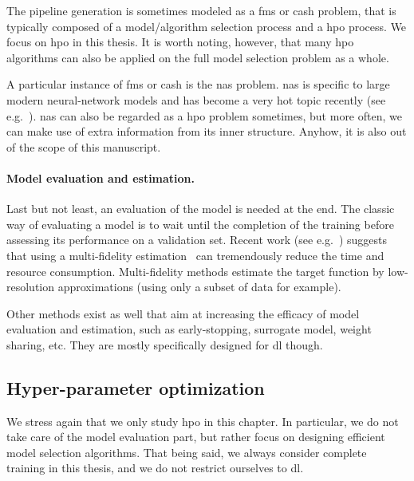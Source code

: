 The pipeline generation is sometimes modeled as a \gls{fms} or \gls{cash} problem, that is typically composed of a model/algorithm selection process and a \gls{hpo} process. We focus on \gls{hpo} in this thesis. It is worth noting, however, that many \gls{hpo} algorithms can also be applied on the full model selection problem as a whole.

A particular instance of \gls{fms} or \gls{cash} is the \gls{nas} problem. \gls{nas} is specific to large modern neural-network models and has become a very hot topic recently (see e.g.~\citealt{elsken2018nas,zoph2018nas,kandasamy2018nas,liu2019darts}). \gls{nas} can also be regarded as a \gls{hpo} problem sometimes, but more often, we can make use of extra information from its inner structure. Anyhow, it is also out of the scope of this manuscript.

\paragraph{Model evaluation and estimation.}
Last but not least, an evaluation of the model is needed at the end. The classic way of evaluating a model is to wait until the completion of the training before assessing its performance on a validation set. Recent work (see e.g.~\citealt{li2017hyperband}) suggests that using a multi-fidelity estimation~\citep{huang2006multifidelity,wu2019multi-fidelity,peherstorfer2018multifidelity} can tremendously reduce the time and resource consumption. Multi-fidelity methods estimate the target function by low-resolution approximations (using only a subset of data for example).

Other methods exist as well that aim at increasing the efficacy of model evaluation and estimation, such as early-stopping, surrogate model, weight sharing, etc. They are mostly specifically designed for \gls{dl} though.
    

\subsection{Hyper-parameter optimization}\label{sec:dttts.survey.hpo}

We stress again that we only study \gls{hpo} in this chapter. In particular, we do not take care of the model evaluation part, but rather focus on designing efficient model selection algorithms. That being said, we always consider complete training in this thesis, and we do not restrict ourselves to \gls{dl}.

